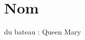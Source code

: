 \hypertarget{_nom-example}{}\section{Nom}
du bateau \+: Queen Mary


\begin{DoxyCodeInclude}
\end{DoxyCodeInclude}
 